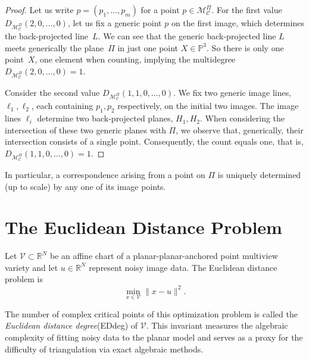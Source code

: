 \documentclass{article}
\newcommand{\RR}{\mathbb{R}}
\begin{document}
\begin{proof}
Let us write $p=(p_1,\ldots,p_m)$ for a point $p\in \mathcal{M}^\Pi_{\mathcal{C}}$. For the first value~$D_{\mathcal{M}^\Pi_{\mathcal{C}}}(2,0,\ldots,0)$, let us fix a generic point $p$ on the first image, which determines the back-projected line~$L$. We can see that the generic back-projected line $L$ meets generically the plane~$\Pi$ in just one point $X\in \mathbb{P}^3$. So there is only one point~$X$, one element when counting, implying the multidegree~$D_{\mathcal{M}^\Pi_{\mathcal{C}}}(2,0,\ldots,0)=1$.

Consider the second value $D_{\mathcal{M}^\Pi_{\mathcal{C}}}(1,1,0,\ldots,0)$. 
We fix two generic image lines,~$\ell_1,\ell_2$, each containing $p_1,p_2$ respectively, on the initial two images. The image lines $\ell_i$ determine two back-projected planes, $H_1, H_2$. When considering the intersection of these two generic planes with $\Pi$, we observe that, generically, their intersection consists of a single point. Consequently, the count equals one, that is,
\(
D_{\mathcal{M}^\Pi_{\mathcal{C}}}(1,1,0,\ldots,0)=1.
\)
\end{proof}
In particular, a correspondence arising from a point on $\Pi$ is uniquely determined (up to scale) by any one of its image points.

\section{The Euclidean Distance Problem}

Let \(\mathcal{V} \subset \RR^N\) be an affine chart of a planar-planar-anchored point multiview variety and let \(u \in \RR^N\) represent noisy image data. The Euclidean distance problem is
\begin{equation}
\min_{x \in \mathcal{V}} \|x - u\|^2. \label{eq:EDdeg_problem}
\end{equation}

The number of complex critical points of this optimization problem is called the \emph{Euclidean distance degree}(EDdeg) of \(\mathcal{V}\). This invariant measures the algebraic complexity of fitting noisy data to the planar model and serves as a proxy for the difficulty of triangulation via exact algebraic methods.
\end{document}

